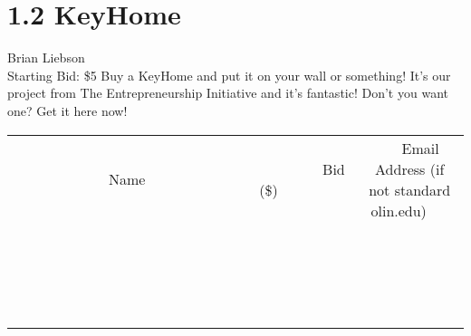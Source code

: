 \documentclass[11pt]{article}
\begin{document}
\section*{1.2 KeyHome}
Brian Liebson
\\
Starting Bid: \$5
\newline
Buy a KeyHome and put it on your wall or something! It's our project from The Entrepreneurship Initiative and it's fantastic! Don't you want one? Get it here now!
\\[3ex]
\begin{tabular}{c c c}
~~~~~~~~~~~~~Name~~~~~~~~~~~~~ & ~~~~~~~~~Bid (\$)~~~~~~~~~  & ~~~Email Address (if not standard olin.edu)~~~\\
 & & \\
\hline
 & & \\
\hline
 & & \\
\hline
 & & \\
\hline
 & & \\
\hline
 & & \\
\hline
 & & \\
\hline
 & & \\
\hline
 & & \\
\hline
 & & \\
\hline
 & & \\
\hline
 & & \\
\hline
 & & \\
\hline
 & & \\
\hline
 & & \\
\hline
 & & \\
\hline
 & & \\
\hline
 & & \\
\hline
 & & \\
\hline
\end{tabular}
\newpage
\end{document}
